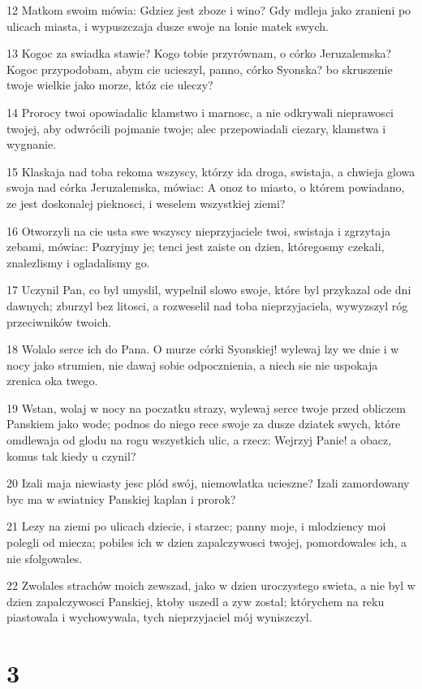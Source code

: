 \par 12 Matkom swoim mówia: Gdziez jest zboze i wino? Gdy mdleja jako zranieni po ulicach miasta, i wypuszczaja dusze swoje na lonie matek swych.
\par 13 Kogoc za swiadka stawie? Kogo tobie przyrównam, o córko Jeruzalemska? Kogoc przypodobam, abym cie ucieszyl, panno, córko Syonska? bo skruszenie twoje wielkie jako morze, któz cie uleczy?
\par 14 Prorocy twoi opowiadalic klamstwo i marnosc, a nie odkrywali nieprawosci twojej, aby odwrócili pojmanie twoje; alec przepowiadali ciezary, klamstwa i wygnanie.
\par 15 Klaskaja nad toba rekoma wszyscy, którzy ida droga, swistaja, a chwieja glowa swoja nad córka Jeruzalemska, mówiac: A onoz to miasto, o którem powiadano, ze jest doskonalej pieknosci, i weselem wszystkiej ziemi?
\par 16 Otworzyli na cie usta swe wszyscy nieprzyjaciele twoi, swistaja i zgrzytaja zebami, mówiac: Pozryjmy je; tenci jest zaiste on dzien, któregosmy czekali, znalezlismy i ogladalismy go.
\par 17 Uczynil Pan, co byl umyslil, wypelnil slowo swoje, które byl przykazal ode dni dawnych; zburzyl bez litosci, a rozweselil nad toba nieprzyjaciela, wywyzszyl róg przeciwników twoich.
\par 18 Wolalo serce ich do Pana. O murze córki Syonskiej! wylewaj lzy we dnie i w nocy jako strumien, nie dawaj sobie odpocznienia, a niech sie nie uspokaja zrenica oka twego.
\par 19 Wstan, wolaj w nocy na poczatku strazy, wylewaj serce twoje przed obliczem Panskiem jako wode; podnos do niego rece swoje za dusze dziatek swych, które omdlewaja od glodu na rogu wszystkich ulic, a rzecz: Wejrzyj Panie! a obacz, komus tak kiedy u czynil?
\par 20 Izali maja niewiasty jesc plód swój, niemowlatka ucieszne? Izali zamordowany byc ma w swiatnicy Panskiej kaplan i prorok?
\par 21 Lezy na ziemi po ulicach dziecie, i starzec; panny moje, i mlodziency moi polegli od miecza; pobiles ich w dzien zapalczywosci twojej, pomordowales ich, a nie sfolgowales.
\par 22 Zwolales strachów moich zewszad, jako w dzien uroczystego swieta, a nie byl w dzien zapalczywosci Panskiej, ktoby uszedl a zyw zostal; którychem na reku piastowala i wychowywala, tych nieprzyjaciel mój wyniszczyl.

\chapter{3}

